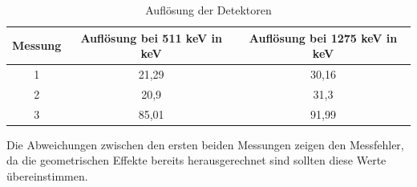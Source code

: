 \documentclass[a4paper,11pt,twoside]{article}
\begin{document}
\begin{table}
\begin{center}
    \caption{Auflösung der Detektoren}
    \label{l3}
    \begin{tabular}[c]{|c|c|c|}
    \hline
    Messung & Auflösung bei 511 keV in keV&Auflösung bei 1275 keV in keV \\
	\hline 
     1 & 21,29 & 30,16\\\hline
     2 & 20,9 & 31,3\\\hline
     3 & 85,01 & 91,99\\\hline
     
    
    \hline
    \end{tabular}
\end{center}
\end{table}
 Die Abweichungen zwischen den ersten beiden Messungen zeigen den Messfehler, da die geometrischen Effekte bereits herausgerechnet sind sollten diese Werte übereinstimmen.
\end{document}
